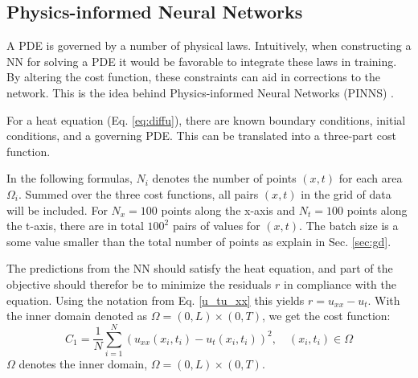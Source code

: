 
\subsection{Physics-informed Neural Networks}\label{sec:PINNs}

A PDE is governed by a number of physical laws. 
Intuitively, when constructing a NN for solving a PDE it would be favorable to integrate these laws in training. By altering the cost function, these constraints can aid in corrections to the network. 
This is the idea behind Physics-informed Neural Networks (PINNS) \cite{PINNs}.

For a heat equation (Eq. \ref{eq:diffu}), there are known boundary conditions, initial conditions, and a governing PDE. 
This can be translated into a three-part cost function.

In the following formulas, $N_i$ denotes the number of points $(x, t)$ for each area $\Omega_i$. Summed over the three cost functions, all pairs $(x,t)$ in the grid of data will be included. 
For $N_x = 100$ points along the x-axis and $N_t = 100$ points along the t-axis, there are in total $100^2$ pairs of values for $(x,t)$. 
The batch size is a some value smaller than the total number of points as explain in Sec. \ref{sec:gd}.


The predictions from the NN should satisfy the heat equation, and part of the objective should therefor be to minimize the residuals $r$ in compliance with the equation. Using the notation from Eq. \ref{u_tu_xx} this yields $r = u_{xx} - u_t$. With the inner domain denoted as $\Omega = (0, L) \times (0, T)$, we get the cost function: 
\begin{equation}
    C_1 = \frac{1}{N}\sum_{i=1}^{N}(u_{xx}(x_i,t_i) - u_t(x_i,t_i))^2, \quad (x_i,t_i) \in \Omega
\end{equation}
$\Omega$ denotes the inner domain, $\Omega = (0, L) \times (0, T)$.

